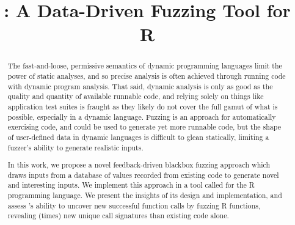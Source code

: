 \documentclass[sigplan,anonymous,review]{acmart}
\begin{document}
\title{\tool: A Data-Driven Fuzzing Tool for R}

\begin{abstract}

The fast-and-loose, permissive semantics of dynamic programming languages limit the power of static analyses, and so precise analysis is often achieved through running code with dynamic program analysis. 
That said, dynamic analysis is only as good as the quality and quantity of available runnable code, and relying solely on things like application test suites is fraught as they likely do not cover the full gamut of what is possible, especially in a dynamic language.
Fuzzing is an approach for automatically exercising code, and could be used to generate yet more runnable code, but the shape of user-defined data in dynamic languages is difficult to glean statically, limiting a fuzzer's ability to generate realistic inputs.

In this work, we propose a novel feedback-driven blackbox fuzzing approach which draws inputs from a database of values recorded from existing code to generate novel and interesting inputs.
We implement this approach in a tool called \tool for the R programming language.
We present the insights of its design and implementation, and assess \tool's ability to uncover new successful function calls by fuzzing \UFNumFunctions R functions, revealing \UFSignatrSignatures (\UFSignatrBaselineSignaturesRatio times) new unique call signatures than existing code alone.


%
%




\end{abstract}
\end{document}
